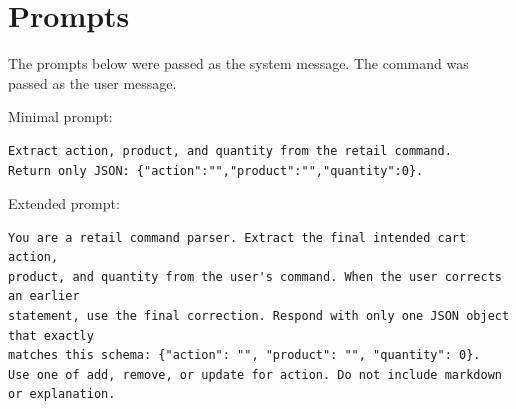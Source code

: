 \documentclass[journal,article,submit,pdftex,moreauthors]{Definitions/mdpi}
\begin{document}





\appendixstart
\appendix
\section[\appendixname~\thesection]{Prompts}\label{app:prompts}

The prompts below were passed as the system message. The command was passed as the user message.

Minimal prompt:
\begin{verbatim}
Extract action, product, and quantity from the retail command.
Return only JSON: {"action":"","product":"","quantity":0}.
\end{verbatim}

Extended prompt:
\begin{verbatim}
You are a retail command parser. Extract the final intended cart action,
product, and quantity from the user's command. When the user corrects an earlier
statement, use the final correction. Respond with only one JSON object that exactly
matches this schema: {"action": "", "product": "", "quantity": 0}.
Use one of add, remove, or update for action. Do not include markdown or explanation.
\end{verbatim}
\end{document}
